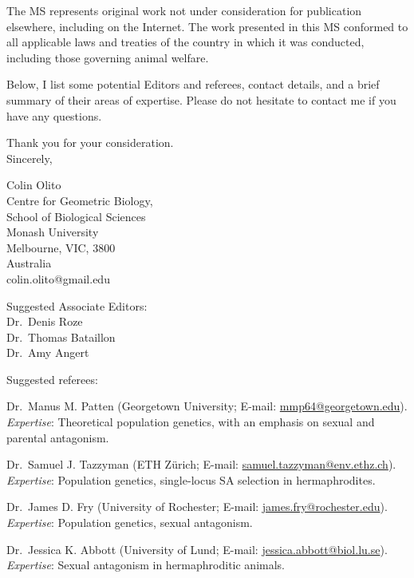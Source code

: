 \documentclass[11pt]{article}
\begin{document}
The MS represents original work not under consideration for publication elsewhere, including on the Internet. The work presented in this MS conformed to all applicable laws and treaties of the country in which it was conducted, including those governing animal welfare. 
\bigskip

Below, I list some potential Editors and referees, contact details, and a brief summary of their areas of expertise. Please do not hesitate to contact me if you have any questions.
\bigskip

\noindent Thank you for your consideration. \\
\noindent Sincerely,
\bigskip

\noindent Colin Olito \\
\noindent Centre for Geometric Biology, \\
\noindent School of Biological Sciences \\
\noindent Monash University \\
\noindent Melbourne, VIC, 3800 \\
\noindent Australia \\
\noindent colin.olito@gmail.edu \\

\bigskip
\hline
\bigskip

\noindent Suggested Associate Editors: \\
\noindent Dr.~Denis Roze \\
\noindent Dr.~Thomas Bataillon \\
\noindent Dr.~Amy Angert \\
\bigskip

\noindent{} Suggested referees:
\bigskip

\noindent{} Dr.~Manus M. Patten (Georgetown University; E-mail: \url{mmp64@georgetown.edu}). \\
\noindent{} \textit{Expertise}: Theoretical population genetics, with an emphasis on sexual and parental antagonism.
\bigskip

\noindent{} Dr.~Samuel J. Tazzyman (ETH Z{\"u}rich; E-mail: \url{samuel.tazzyman@env.ethz.ch}). \\
\noindent{} \textit{Expertise}: Population genetics, single-locus SA selection in hermaphrodites. 
\bigskip

\noindent{} Dr.~James D. Fry (University of Rochester; E-mail: \url{james.fry@rochester.edu}). \\
\noindent{} \textit{Expertise}: Population genetics, sexual antagonism.
\bigskip

\noindent{} Dr.~Jessica K. Abbott (University of Lund; E-mail: \url{jessica.abbott@biol.lu.se}). \\
\noindent{} \textit{Expertise}: Sexual antagonism in hermaphroditic animals.
\bigskip
\end{document}
